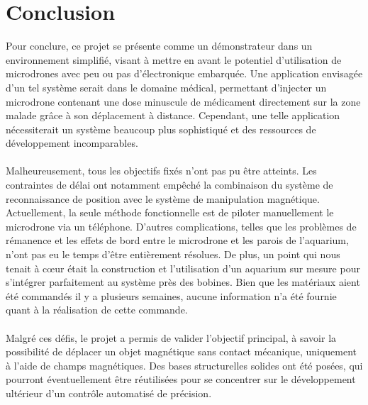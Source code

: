 \documentclass{article}
\begin{document}
\section{Conclusion}
Pour conclure, ce projet se présente comme un démonstrateur dans un environnement simplifié, visant à mettre en avant le potentiel d'utilisation de microdrones avec peu ou pas d'électronique embarquée. Une application envisagée d'un tel système serait dans le domaine médical, permettant d'injecter un microdrone contenant une dose minuscule de médicament directement sur la zone malade grâce à son déplacement à distance. Cependant, une telle application nécessiterait un système beaucoup plus sophistiqué et des ressources de développement incomparables.
\\\\
Malheureusement, tous les objectifs fixés n'ont pas pu être atteints. Les contraintes de délai ont notamment empêché la combinaison du système de reconnaissance de position avec le système de manipulation magnétique. Actuellement, la seule méthode fonctionnelle est de piloter manuellement le microdrone via un téléphone. D'autres complications, telles que les problèmes de rémanence et les effets de bord entre le microdrone et les parois de l'aquarium, n'ont pas eu le temps d'être entièrement résolues. De plus, un point qui nous tenait à cœur était la construction et l'utilisation d'un aquarium sur mesure pour s'intégrer parfaitement au système près des bobines. Bien que les matériaux aient été commandés il y a plusieurs semaines, aucune information n'a été fournie quant à la réalisation de cette commande.
\\\\
Malgré ces défis, le projet a permis de valider l'objectif principal, à savoir la possibilité de déplacer un objet magnétique sans contact mécanique, uniquement à l'aide de champs magnétiques. Des bases structurelles solides ont été posées, qui pourront éventuellement être réutilisées pour se concentrer sur le développement ultérieur d'un contrôle automatisé de précision.
\newpage
{}

\end{document}
